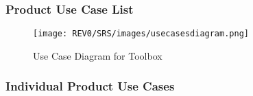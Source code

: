 \documentclass[12pt, titlepage]{article}
\begin{document}
\subsubsection{Product Use Case List}
\begin{figure}[H]
	    \begin{center}
    	    \texttt{[image: REV0/SRS/images/usecasesdiagram.png]}
    	    \caption{Use Case Diagram for Toolbox}
    	    \label{fig:Toolbox Use Case Diagram}
    	\end{center}
\end{figure}

\newpage

\subsubsection{Individual Product Use Cases}
\end{document}
